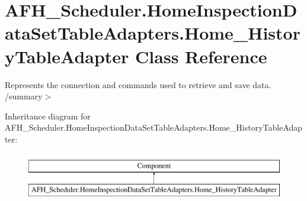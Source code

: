 \section{A\+F\+H\+\_\+\+Scheduler.\+Home\+Inspection\+Data\+Set\+Table\+Adapters.\+Home\+\_\+\+History\+Table\+Adapter Class Reference}
\label{class_a_f_h___scheduler_1_1_home_inspection_data_set_table_adapters_1_1_home___history_table_adapter}


Represents the connection and commands used to retrieve and save data. /summary$>$  


Inheritance diagram for A\+F\+H\+\_\+\+Scheduler.\+Home\+Inspection\+Data\+Set\+Table\+Adapters.\+Home\+\_\+\+History\+Table\+Adapter\+:\begin{figure}[H]
\begin{center}
\leavevmode
\includegraphics[height=2.000000cm]{class_a_f_h___scheduler_1_1_home_inspection_data_set_table_adapters_1_1_home___history_table_adapter}
\end{center}
\end{figure}
